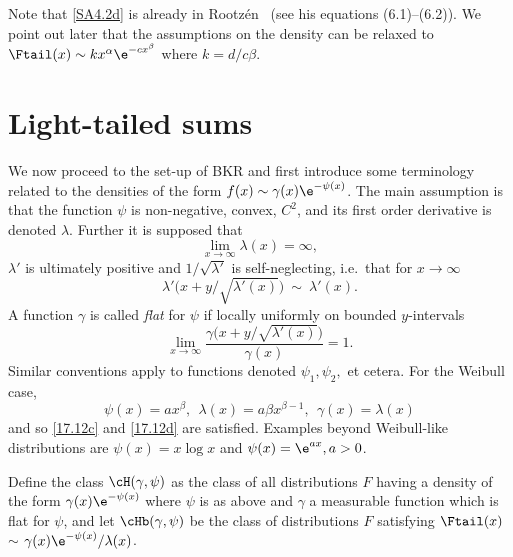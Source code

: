 Note that \eqref{SA4.2d} is already in Rootz\'en~\cite{rootzen1987ratio} (see his equations
(6.1)--(6.2)). We point out later that the assumptions on the density can be relaxed
to $\Ftail(x)\sim kx^{\alpha}\e^{-c x^\beta}$ where $k=d/c\beta$.


\section{Light-tailed sums}\label{S:BKR}

We now proceed to the set-up of BKR and first
introduce some terminology related to the densities of the form  $f(x)\sim \gamma(x)\e^{-\psi(x)}$.  The main assumption is that the function $\psi$ is non-negative, convex,
$C^2$,  and its first order derivative is denoted $\lambda$. Further it is supposed that
\begin{equation} \label{lambdaI}
	\lim_{x\to \infty}\lambda(x)=\infty,
\end{equation}
$\lambda'$ is ultimately positive and $1/\sqrt{\lambda'}$ is self-neglecting, i.e.\ that for $x\to\infty$
\begin{equation}\label{17.12c}
\lambda'\bigl(x+y/\sqrt{\lambda'(x)}\bigr)\ \sim\ \lambda'(x).
\end{equation}
A function $\gamma$ is called \emph{flat} for $\psi$ if locally uniformly on bounded $y$-intervals
\begin{equation}\label{17.12d}
\lim_{x\to \infty}\frac{ \gamma\bigl(x+y/\sqrt{\lambda'(x)}\bigr)}{\gamma(x)}=1.
\end{equation}
Similar conventions apply to functions denoted $\psi_1,\psi_2,$ et cetera.
For the Weibull case,
\[ \psi(x)=ax^\beta,\ \ \lambda(x)=a\beta x^{\beta-1},\ \ \gamma(x) = \lambda(x) \]
and so \eqref{17.12c} and \eqref{17.12d} are satisfied.
Examples beyond Weibull-like distributions are $\psi(x)=x\log x$ and $\psi(x)=\e^{ax},a>0$.

Define the class $\cH(\gamma,\psi)$ as the class of all distributions $F$ having a density
of the form $\gamma(x)\e^{-\psi(x)}$ where $\psi$ is as above and $\gamma$ a measurable function which is flat for $\psi$,
and let  $\cHb(\gamma,\psi)$ be the class of  distributions $F$ satisfying
$\Ftail(x)$ $\sim$ $\gamma(x)\e^{-\psi(x)}/\lambda(x)$.

